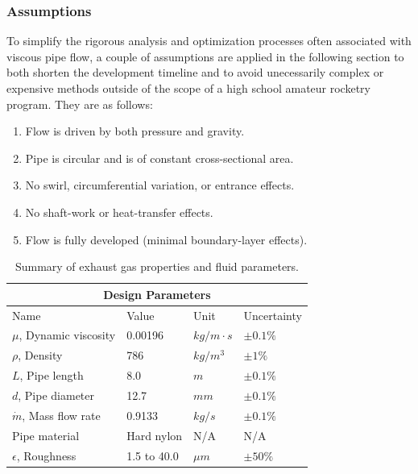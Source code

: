 \documentclass[9pt]{article} %
\numberwithin{equation}{section} %
\begin{document}
\subsubsection{Assumptions} \label{sec:assumptions}

To simplify the rigorous analysis and optimization processes often associated with viscous pipe flow, a couple of assumptions are applied in the following section to both shorten the development timeline and to avoid unecessarily complex or expensive methods outside of the scope of a high school amateur rocketry program. They are as follows:
\begin{enumerate}
\item Flow is driven by both pressure and gravity.
\item Pipe is circular and is of constant cross-sectional area. \label{itm:constant-area}
\item No swirl, circumferential variation, or entrance effects.
\item No shaft-work or heat-transfer effects. \label{itm:heat-effects}
\item Flow is fully developed (minimal boundary-layer effects).
\end{enumerate}

\begin{table}[!htb]
\centering
\begin{tabular}{ |p{4cm}||p{4cm}|p{2cm}|p{2cm}|  }
\hline
\multicolumn{4}{|c|}{Design Parameters} \\
\hline
Name & Value & Unit & Uncertainty \\
\hline
$\mu$, Dynamic viscosity  &  0.00196  &  $kg/m \cdot s$  &  $\pm 0.1 \%$ \\
$\rho$, Density  &  786  &  $kg/m^{3}$  &  $\pm 1 \%$ \\
$L$, Pipe length  &  8.0  &  $m$  &  $\pm 0.1 \%$  \\
$d$, Pipe diameter  &  12.7  &  $mm$  &   $\pm 0.1 \%$ \\
$\dot{m}$, Mass flow rate  &  0.9133  &  $kg/s$  &   $\pm 0.1 \%$ \\
Pipe material  &  Hard nylon  &  N/A  &  N/A \\
$\epsilon$, Roughness  &  1.5 to 40.0  &  $\mu m$  &  $\pm 50 \%$ \\
\hline
\end{tabular}
\caption{Summary of exhaust gas properties and fluid parameters.}
\label{table:pipe_parameters}
\end{table}

\printbibliography
\end{document}
